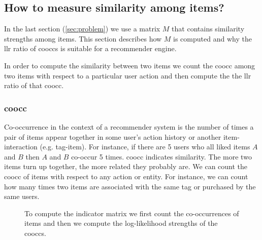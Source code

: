 \subsection{How to measure similarity among items?}
\label{sec:llr}

In the last section (\ref{sec:problem}) we use a matrix $M$ that contains similarity strengths among items. This section describes how $M$ is computed and why the \gls{llr} ratio of \glspl{coocc} is suitable for a recommender engine.

In order to compute the similarity between two items we count the \gls{coocc} among two items with respect to a particular user action and then compute the the \gls{llr} ratio of that \gls{coocc}.

\subsubsection{\Gls{coocc}}
\label{sec:cooccurence}

Co-occurrence in the context of a recommender system is the number of times a pair of items appear together in some user's action history or another item-interaction (e.g. tag-item). For instance, if there are 5 users who all liked items $A$ and $B$ then $A$ and $B$ co-occur 5 times. \Gls{coocc} indicates similarity. The more two items turn up together, the more related they probably are. We can count the \gls{coocc} of items with respect to any action or entity. For instance, we can count how many times two items are associated with the same tag or purchased by the same users.

\begin{figure}
\centering
{}
\caption{To compute the indicator matrix we first count the co-occurrences of items and then we compute the log-likelihood strengths of the \glspl{coocc}.}
\label{fig:llrworkflow}
\end{figure}

